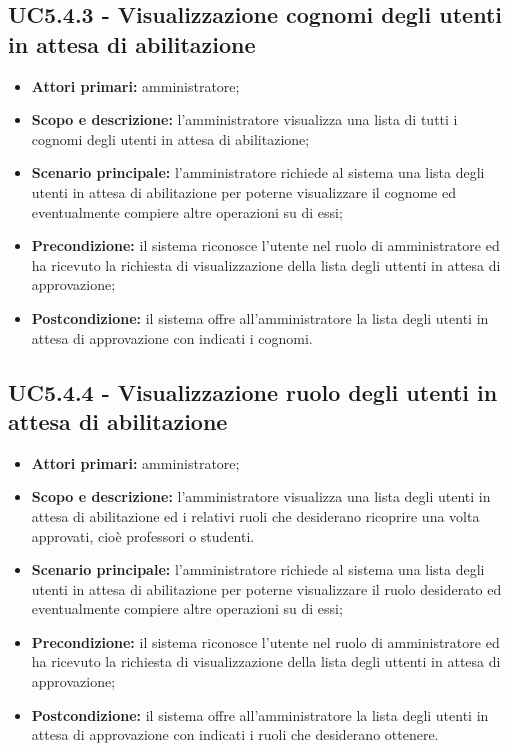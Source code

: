 \documentclass[AnalisiDeiRequisiti.tex]{subfiles}
\begin{document}
\subsection{UC5.4.3 - Visualizzazione cognomi degli utenti in attesa di abilitazione}
\begin{itemize}
	\item \textbf{Attori primari:} amministratore;
	\item \textbf{Scopo e descrizione:} l'amministratore visualizza una lista di tutti i cognomi degli utenti in attesa di abilitazione;
	\item \textbf{Scenario principale:} l'amministratore richiede al sistema una lista degli utenti in attesa di abilitazione per poterne visualizzare il cognome ed eventualmente compiere altre operazioni su di essi;
	\item \textbf{Precondizione:} il sistema riconosce l'utente nel ruolo di amministratore ed ha ricevuto la richiesta di visualizzazione della lista degli uttenti in attesa di approvazione;
	\item \textbf{Postcondizione:} il sistema offre all'amministratore la lista degli utenti in attesa di approvazione con indicati i cognomi.
\end{itemize}
\subsection{UC5.4.4 - Visualizzazione ruolo degli utenti in attesa di abilitazione}
\begin{itemize}
	\item \textbf{Attori primari:} amministratore;
	\item \textbf{Scopo e descrizione:} l'amministratore visualizza una lista degli utenti in attesa di abilitazione ed i relativi ruoli che desiderano ricoprire una volta approvati, cioè professori o studenti.
	\item \textbf{Scenario principale:} l'amministratore richiede al sistema una lista degli utenti in attesa di abilitazione per poterne visualizzare il ruolo desiderato ed eventualmente compiere altre operazioni su di essi;
	\item \textbf{Precondizione:} il sistema riconosce l'utente nel ruolo di amministratore ed ha ricevuto la richiesta di visualizzazione della lista degli uttenti in attesa di approvazione;
	\item \textbf{Postcondizione:} il sistema offre all'amministratore la lista degli utenti in attesa di approvazione con indicati i ruoli che desiderano ottenere.
\end{itemize}
\end{document}
